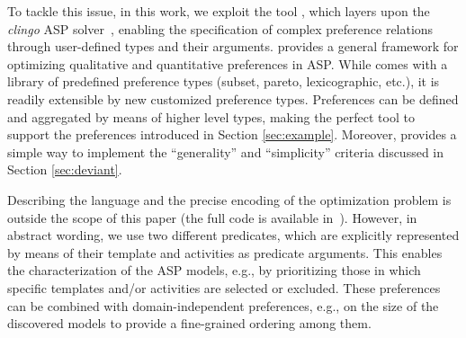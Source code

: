 To tackle this issue, in this work, we exploit the \asprin tool \cite{DBLP:conf/aaai/BrewkaD0S15}, which layers upon the \emph{clingo} \ac{ASP} solver~\cite{clingo}, enabling the specification of complex preference relations through user-defined  types and their arguments. 
%
%
\asprin provides a general framework for optimizing qualitative and quantitative preferences in \ac{ASP}. %
While \asprin comes with a library of predefined preference types (subset, pareto, lexicographic, etc.), it is readily extensible by new customized preference types. Preferences can be defined and aggregated by means of higher level types, making \asprin the perfect tool to support the preferences introduced in Section \ref{sec:example}. Moreover, %
\asprin provides a simple way to implement the ``generality'' and ``simplicity'' criteria discussed in Section \ref{sec:deviant}.



Describing the \asprin language and the precise encoding of the optimization problem is outside the scope of this paper (the full code is available in~\cite{zenodo:experiments}). However, in abstract wording, we use two different predicates,
which are explicitly represented by means of their template and activities as predicate arguments.
%
This enables the characterization of the \ac{ASP} models, e.g., by prioritizing those in which specific templates and/or activities are selected or excluded. These preferences can be combined with domain-independent preferences, e.g., on the size of the discovered models to provide a fine-grained ordering among them.
